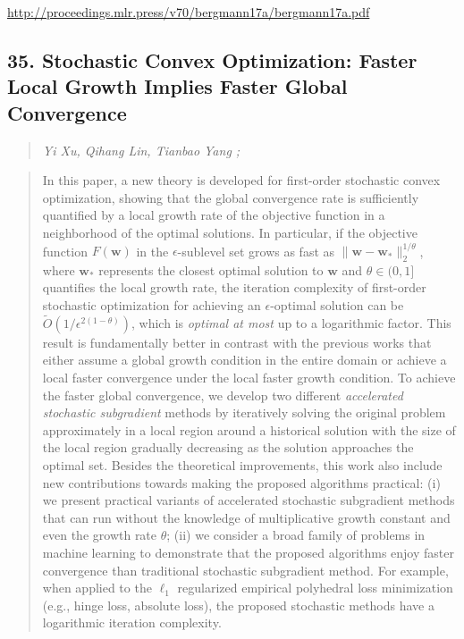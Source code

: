 \documentclass{article}
\begin{document}
\href{http://proceedings.mlr.press/v70/bergmann17a/bergmann17a.pdf}{http://proceedings.mlr.press/v70/bergmann17a/bergmann17a.pdf}

\subsection{35. Stochastic Convex Optimization: Faster Local Growth Implies Faster Global Convergence}

\begin{quote}
\footnotesize{\textit{Yi Xu, Qihang Lin, Tianbao Yang ;}}

\end{quote}

\begin{quote}
    In this paper, a new theory is developed for first-order stochastic convex optimization, showing that the global convergence rate is sufficiently quantified by a local growth rate of the objective function in a neighborhood of the optimal solutions. In particular, if the objective function $F(\mathbf{w})$ in the $\epsilon$-sublevel set grows as fast as $\|\mathbf{w} - \mathbf{w}_*\|_2^{1/\theta}$, where $\mathbf{w}_*$ represents the closest optimal solution to $\mathbf{w}$ and $\theta\in(0,1]$ quantifies the local growth rate, the iteration complexity of first-order stochastic optimization for achieving an $\epsilon$-optimal solution can be $\widetilde O(1/\epsilon^{2(1-\theta)})$, which is \textit{optimal at most} up to a logarithmic factor. This result is fundamentally better in contrast with the previous works that either assume a global growth condition in the entire domain or achieve a local faster convergence under the local faster growth condition. To achieve the faster global convergence, we develop two different \textit{accelerated stochastic subgradient} methods by iteratively solving the original problem approximately in a local region around a historical solution with the size of the local region gradually decreasing as the solution approaches the optimal set. Besides the theoretical improvements, this work also include new contributions towards making the proposed algorithms practical: (i) we present practical variants of accelerated stochastic subgradient methods that can run without the knowledge of multiplicative growth constant and even the growth rate $\theta$; (ii) we consider a broad family of problems in machine learning to demonstrate that the proposed algorithms enjoy faster convergence than traditional stochastic subgradient method. For example, when applied to the $\ell_1$ regularized empirical polyhedral loss minimization (e.g., hinge loss, absolute loss), the proposed stochastic methods have a logarithmic iteration complexity.  
\end{quote}
\end{document}

